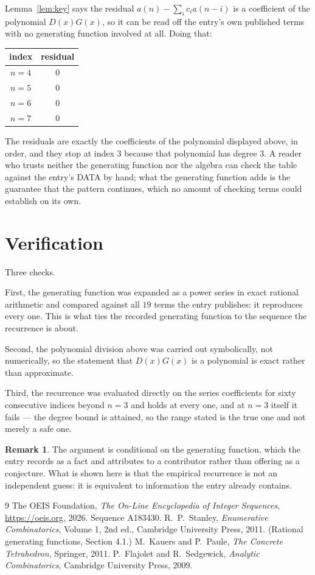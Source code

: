 \documentclass[11pt,a4paper]{article}
\theoremstyle{plain}
\theoremstyle{definition}
\newtheorem{remark}[theorem]{Remark}
\begin{document}
Lemma~\ref{lem:key} says the residual $a(n)-\sum_ic_ia(n-i)$ is a coefficient of the
polynomial $D(x)G(x)$, so it can be read off the entry's own published terms with no
generating function involved at all. Doing that:
\begin{center}
\begin{tabular}{cc}
index & residual \\ \hline
$n=4$ & $0$ \\
$n=5$ & $0$ \\
$n=6$ & $0$ \\
$n=7$ & $0$
\end{tabular}
\end{center}
The residuals are exactly the coefficients of the polynomial displayed above, in order, and
they stop at index $3$ because that polynomial has degree $3$. A reader who trusts
neither the generating function nor the algebra can check the table against the entry's DATA
by hand; what the generating function adds is the guarantee that the pattern continues, which
no amount of checking terms could establish on its own.

\section{Verification}

Three checks.

First, the generating function was expanded as a power series in exact rational arithmetic and
compared against all $19$ terms the entry publishes: it reproduces every one. This is
what ties the recorded generating function to the sequence the recurrence is about.

Second, the polynomial division above was carried out symbolically, not numerically, so the
statement that $D(x)G(x)$ is a polynomial is exact rather than approximate.

Third, the recurrence was evaluated directly on the series coefficients for sixty consecutive
indices beyond $n=3$ and holds at every one, and at $n=3$ itself it fails --- the
degree bound is attained, so the range stated is the true one and not merely a safe one.

\begin{remark}
The argument is conditional on the generating function, which the entry records as a fact and
attributes to a contributor rather than offering as a conjecture. What is shown here is that
the empirical recurrence is not an independent guess: it is equivalent to information the
entry already contains.
\end{remark}

\begin{thebibliography}{9}
 The OEIS Foundation, \emph{The On-Line Encyclopedia of Integer
Sequences}, \url{https://oeis.org}, 2026. Sequence A183430.
 R.~P.~Stanley, \emph{Enumerative Combinatorics}, Volume 1, 2nd ed.,
Cambridge University Press, 2011. (Rational generating functions, Section 4.1.)
 M.~Kauers and P.~Paule, \emph{The Concrete Tetrahedron}, Springer, 2011.
 P.~Flajolet and R.~Sedgewick, \emph{Analytic Combinatorics}, Cambridge
University Press, 2009.
\end{thebibliography}
\end{document}
